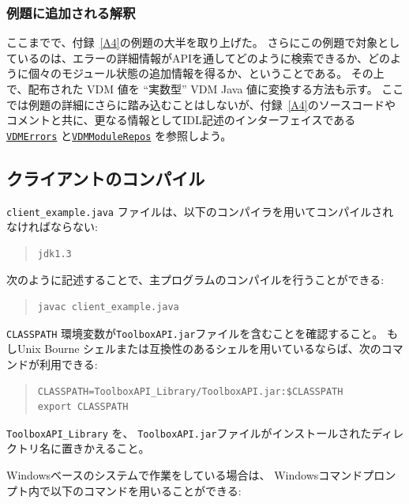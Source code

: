 \documentclass[\pformat,12pt]{jarticle}
\newcommand{\VDMErrors}{\hyperlink{interface.VDMErrors}{VDMErrors}}
\newcommand{\VDMModuleRepos}{\hyperlink{interface.VDMModuleRepos}{VDMModuleRepos}}
\begin{document}
\subsubsection{例題に追加される解釈}

ここまでで、付録~\ref{A4}の例題の大半を取り上げた。
さらにこの例題で対象としているのは、エラーの詳細情報がAPIを通してどのように検索できるか、どのように個々のモジュール状態の追加情報を得るか、ということである。
その上で、配布された VDM 値を ``実数型'' VDM Java 値に変換する方法も示す。
 ここでは例題の詳細にさらに踏み込むことはしないが、付録~\ref{A4}のソースコードやコメントと共に、更なる情報としてIDL記述のインターフェイスである {\tt \VDMErrors} と{\tt \VDMModuleRepos} を参照しよう。

\subsection{クライアントのコンパイル}

{\tt client\_example.java} ファイルは、以下のコンパイラを用いてコンパイルされなければならない:

\begin{quote}
\begin{verbatim}
jdk1.3
\end{verbatim}
\end{quote}

次のように記述することで、主プログラムのコンパイルを行うことができる:

\begin{quote}
\begin{verbatim}
javac client_example.java
\end{verbatim}  
\end{quote}

{\tt CLASSPATH} 環境変数が{\tt ToolboxAPI.jar}ファイルを含むことを確認すること。
もしUnix Bourne シェルまたは互換性のあるシェルを用いているならば、次のコマンドが利用できる:

\begin{quote}
\begin{verbatim}
CLASSPATH=ToolboxAPI_Library/ToolboxAPI.jar:$CLASSPATH
export CLASSPATH
\end{verbatim}  %
\end{quote}

{\tt ToolboxAPI\_Library} を、 {\tt ToolboxAPI.jar}ファイルがインストールされたディレクトリ名に置きかえること。

Windowsベースのシステムで作業をしている場合は、 Windowsコマンドプロンプト内で以下のコマンドを用いることができる: 
\end{document}
